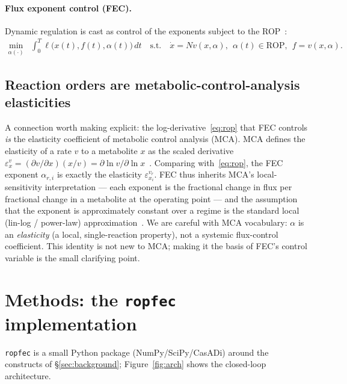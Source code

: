 \documentclass[11pt]{article}
\newcommand{\rop}{\mathrm{ROP}}
\begin{document}
\paragraph{Flux exponent control (FEC).} Dynamic regulation is cast as control of
the exponents subject to the ROP~\citep{xiao2023fec}:
\begin{align}
\min_{\alpha(\cdot)} & \int_0^T \ell\bigl(x(t),f(t),\alpha(t)\bigr)\,dt
\quad \text{s.t.} \quad \dot{x} = N v(x,\alpha),\ \ \alpha(t)\in\rop,\ \ f = v(x,\alpha).
\label{eq:fec}
\end{align}

\subsection{Reaction orders are metabolic-control-analysis elasticities}\label{sec:mca}

A connection worth making explicit: the log-derivative~\eqref{eq:rop} that FEC
controls \emph{is} the elasticity coefficient of metabolic control analysis (MCA).
MCA defines the elasticity of a rate $v$ to a metabolite $x$ as the scaled
derivative $\varepsilon^{v}_{x} = (\partial v/\partial x)(x/v) = \partial \ln
v/\partial \ln x$~\citep{kacser1973control,heinrich1974linear,fell1997understanding}.
Comparing with~\eqref{eq:rop}, the FEC exponent $\alpha_{r,i}$ is exactly the
elasticity $\varepsilon^{v_r}_{x_i}$. FEC thus inherits MCA's local-sensitivity
interpretation --- each exponent is the fractional change in flux per fractional
change in a metabolite at the operating point --- and the assumption that the
exponent is approximately constant over a regime is the standard local
(lin-log / power-law) approximation~\citep{hatzimanikatis1997loglinear,visser2003linlog}.
We are careful with MCA vocabulary: $\alpha$ is an \emph{elasticity} (a local,
single-reaction property), not a systemic flux-control coefficient. This identity
is not new to MCA; making it the basis of FEC's control variable is the small
clarifying point.

\section{Methods: the \texttt{ropfec} implementation}\label{sec:methods}

\texttt{ropfec} is a small Python package (NumPy/SciPy/CasADi) around the
constructs of \S\ref{sec:background}; Figure~\ref{fig:arch} shows the closed-loop
architecture.
\end{document}
